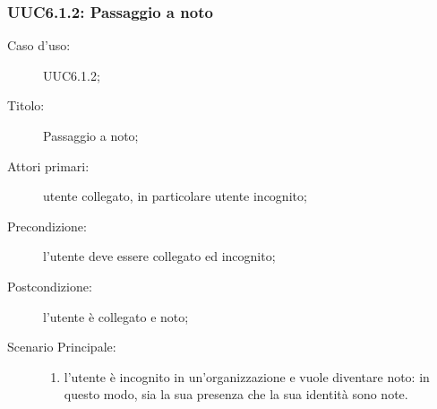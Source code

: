 \documentclass[../../../analisi-dei-requisiti.tex]{subfiles}
\begin{document}
\subsubsection{UUC6.1.2: Passaggio a noto}%
\label{subs:UUC6.1.2}
\begin{description}
  \item[Caso d’uso:] UUC6.1.2;
  \item[Titolo:] Passaggio a noto;
  \item[Attori primari:] utente collegato, in particolare utente incognito;
  \item[Precondizione:] l'utente deve essere collegato ed incognito;
  \item[Postcondizione:] l'utente è collegato e noto;
  \item[Scenario Principale:]
        \begin{enumerate}
          \item l'utente è incognito in un'organizzazione e vuole diventare noto: in questo modo, sia la sua presenza che la sua identità sono note.
        \end{enumerate}
\end{description}
\end{document}
